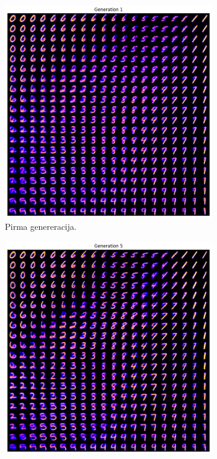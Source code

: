 \documentclass{VUMIFInfKursinis}
\begin{document}
\begin{figure}[H]
    \centering
    \begin{subfigure}[t]{0.45\textwidth} %
        \centering
        \includegraphics[scale=0.40]{img/original_generation_1.png}
        \caption{Pirma genereracija.}
        \label{img:image1}
    \end{subfigure}
    \hfill %
    \begin{subfigure}[t]{0.45\textwidth} %
        \centering
        \includegraphics[scale=0.40]{img/original_generation_5.png}

\end{subfigure}
\end{figure}
\end{document}
